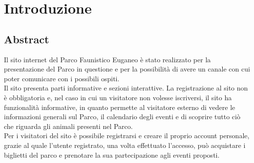 \section{Introduzione}

\subsection{Abstract}
Il sito internet del Parco Faunistico Euganeo è stato realizzato per la presentazione del Parco in questione e per la possibilità di avere un canale con cui poter comunicare con i possibili ospiti.\\
Il sito presenta parti informative e sezioni interattive. La registrazione al sito non è obbligatoria e, nel caso in cui un visitatore non volesse iscriversi, il sito ha funzionalità informative, in quanto permette al visitatore esterno di vedere le informazioni generali sul Parco, il calendario degli eventi e di scoprire tutto ciò che riguarda gli animali presenti nel Parco.\\
Per i visitatori del sito è possibile registrarsi e creare il proprio account personale, grazie al quale l'utente registrato, una volta effettuato l'accesso, può acquistare i biglietti del parco e prenotare la sua partecipazione agli eventi proposti.\\
\pagebreak